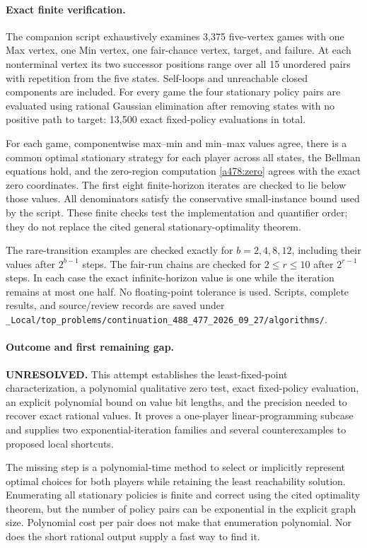\documentclass[11pt]{article}
\begin{document}
\paragraph{Exact finite verification.}
The companion script exhaustively examines 3,375 five-vertex games with
one Max vertex, one Min vertex, one fair-chance vertex, target, and failure.
At each nonterminal vertex its two successor positions range over all
15 unordered pairs with repetition from the five states. Self-loops and
unreachable closed components are included. For every game the four
stationary policy pairs are evaluated using rational Gaussian elimination
after removing states with no positive path to target: 13,500 exact
fixed-policy evaluations in total.

For each game, componentwise max--min and min--max values agree, there
is a common optimal stationary strategy for each player across all states,
the Bellman equations hold, and the zero-region computation
\eqref{a478:zero} agrees with the exact zero coordinates. The first eight
finite-horizon iterates are checked to lie below those values. All
denominators satisfy the conservative small-instance bound used by the
script. These finite checks test the implementation and quantifier order;
they do not replace the cited general stationary-optimality theorem.

The rare-transition examples are checked exactly for $b=2,4,8,12$,
including their values after $2^{b-1}$ steps. The fair-run chains are
checked for $2\leq r\leq10$ after $2^{r-1}$ steps. In each case the
exact infinite-horizon value is one while the iteration remains at most
one half. No floating-point tolerance is used. Scripts, complete results,
and source/review records are saved under
\nolinkurl{_Local/top_problems/continuation_488_477_2026_09_27/algorithms/}.

\paragraph{Outcome and first remaining gap.}
\textbf{UNRESOLVED.} This attempt establishes the least-fixed-point
characterization, a polynomial qualitative zero test, exact fixed-policy
evaluation, an explicit polynomial bound on value bit lengths, and the
precision needed to recover exact rational values. It proves a one-player
linear-programming subcase and supplies two exponential-iteration families
and several counterexamples to proposed local shortcuts.

The missing step is a polynomial-time method to select or implicitly
represent optimal choices for both players while retaining the least
reachability solution. Enumerating all stationary policies is finite and
correct using the cited optimality theorem, but the number of policy pairs
can be exponential in the explicit graph size. Polynomial cost per pair
does not make that enumeration polynomial. Nor does the short rational
output supply a fast way to find it.
\end{document}
